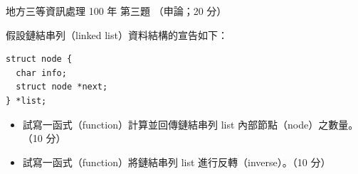 \begin{pastexam}[label={px:df3-100-ds-03}]{地方三等資訊處理 100 年 第三題}
（申論；20 分）

假設鏈結串列（linked list）資料結構的宣告如下：
\begin{verbatim}
struct node {
  char info;
  struct node *next;
} *list;
\end{verbatim}
\begin{itemize}[leftmargin=2.2em, nosep]
\item[㈠] 試寫一函式（function）計算並回傳鏈結串列 list 內部節點（node）之數量。（10 分）
\item[㈡] 試寫一函式（function）將鏈結串列 list 進行反轉（inverse）。（10 分）
\end{itemize}
\end{pastexam}

